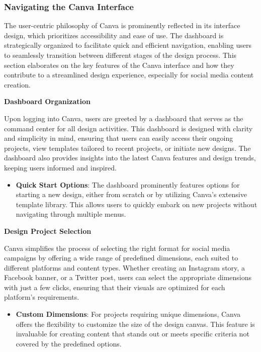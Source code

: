 \documentclass[
]{book}
\providecommand{\tightlist}{%
  \setlength{\itemsep}{0pt}\setlength{\parskip}{0pt}}
\begin{document}
\hypertarget{navigating-the-canva-interface}{%
\subsubsection*{Navigating the Canva Interface}\label{navigating-the-canva-interface}}

The user-centric philosophy of Canva is prominently reflected in its interface design, which prioritizes accessibility and ease of use. The dashboard is strategically organized to facilitate quick and efficient navigation, enabling users to seamlessly transition between different stages of the design process. This section elaborates on the key features of the Canva interface and how they contribute to a streamlined design experience, especially for social media content creation.

\textbf{Dashboard Organization}

Upon logging into Canva, users are greeted by a dashboard that serves as the command center for all design activities. This dashboard is designed with clarity and simplicity in mind, ensuring that users can easily access their ongoing projects, view templates tailored to recent projects, or initiate new designs. The dashboard also provides insights into the latest Canva features and design trends, keeping users informed and inspired.

\begin{itemize}
\tightlist
\item
  \textbf{Quick Start Options}: The dashboard prominently features options for starting a new design, either from scratch or by utilizing Canva's extensive template library. This allows users to quickly embark on new projects without navigating through multiple menus.
\end{itemize}

\textbf{Design Project Selection}

Canva simplifies the process of selecting the right format for social media campaigns by offering a wide range of predefined dimensions, each suited to different platforms and content types. Whether creating an Instagram story, a Facebook banner, or a Twitter post, users can select the appropriate dimensions with just a few clicks, ensuring that their visuals are optimized for each platform's requirements.

\begin{itemize}
\tightlist
\item
  \textbf{Custom Dimensions}: For projects requiring unique dimensions, Canva offers the flexibility to customize the size of the design canvas. This feature is invaluable for creating content that stands out or meets specific criteria not covered by the predefined options.
\end{itemize}
\end{document}
